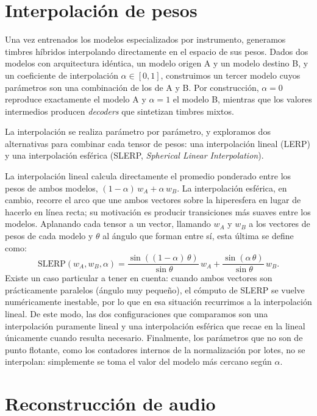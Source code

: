 \documentclass[12pt,a4paper,twoside]{tesis}
\begin{document}
\newpage
\section{Interpolación de pesos}

Una vez entrenados los modelos especializados por instrumento, generamos timbres híbridos interpolando directamente en el espacio de sus pesos. Dados dos modelos con arquitectura idéntica, un modelo origen A y un modelo destino B, y un coeficiente de interpolación $\alpha \in [0, 1]$, construimos un tercer modelo cuyos parámetros son una combinación de los de A y B. Por construcción, $\alpha = 0$ reproduce exactamente el modelo A y $\alpha = 1$ el modelo B, mientras que los valores intermedios producen \textit{decoders} que sintetizan timbres mixtos.

La interpolación se realiza parámetro por parámetro, y exploramos dos alternativas para combinar cada tensor de pesos: una interpolación lineal (LERP) y una interpolación esférica (SLERP, \textit{Spherical Linear Interpolation}).

La interpolación lineal calcula directamente el promedio ponderado entre los pesos de ambos modelos, $(1-\alpha)\, w_A + \alpha\, w_B$. La interpolación esférica, en cambio, recorre el arco que une ambos vectores sobre la hiperesfera en lugar de hacerlo en línea recta; su motivación es producir transiciones más suaves entre los modelos. Aplanando cada tensor a un vector, llamando $w_A$ y $w_B$ a los vectores de pesos de cada modelo y $\theta$ al ángulo que forman entre sí, esta última se define como:
\begin{equation}
\mathrm{SLERP}(w_A, w_B, \alpha) = \frac{\sin\left((1-\alpha)\,\theta\right)}{\sin\theta}\, w_A + \frac{\sin\left(\alpha\,\theta\right)}{\sin\theta}\, w_B.
\end{equation}
Existe un caso particular a tener en cuenta: cuando ambos vectores son prácticamente paralelos (ángulo muy pequeño), el cómputo de SLERP se vuelve numéricamente inestable, por lo que en esa situación recurrimos a la interpolación lineal. De este modo, las dos configuraciones que comparamos son una interpolación puramente lineal y una interpolación esférica que recae en la lineal únicamente cuando resulta necesario. Finalmente, los parámetros que no son de punto flotante, como los contadores internos de la normalización por lotes, no se interpolan: simplemente se toma el valor del modelo más cercano según $\alpha$.

\newpage
\section{Reconstrucción de audio}
\end{document}

